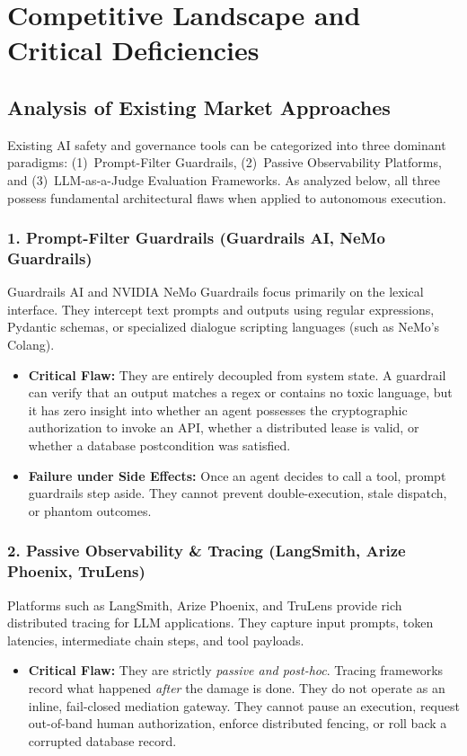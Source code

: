 \documentclass[11pt,a4paper]{article}
\begin{document}
\section{Competitive Landscape and Critical Deficiencies}

\subsection{Analysis of Existing Market Approaches}
Existing AI safety and governance tools can be categorized into three dominant paradigms: (1)~Prompt-Filter Guardrails, (2)~Passive Observability Platforms, and (3)~LLM-as-a-Judge Evaluation Frameworks. As analyzed below, all three possess fundamental architectural flaws when applied to autonomous execution.

\subsubsection{1. Prompt-Filter Guardrails (Guardrails AI, NeMo Guardrails)}
Guardrails AI and NVIDIA NeMo Guardrails focus primarily on the lexical interface. They intercept text prompts and outputs using regular expressions, Pydantic schemas, or specialized dialogue scripting languages (such as NeMo's Colang).
\begin{itemize}[leftmargin=*,itemsep=2pt]
  \item \textbf{Critical Flaw:} They are entirely decoupled from system state. A guardrail can verify that an output matches a regex or contains no toxic language, but it has zero insight into whether an agent possesses the cryptographic authorization to invoke an API, whether a distributed lease is valid, or whether a database postcondition was satisfied.
  \item \textbf{Failure under Side Effects:} Once an agent decides to call a tool, prompt guardrails step aside. They cannot prevent double-execution, stale dispatch, or phantom outcomes.
\end{itemize}

\subsubsection{2. Passive Observability \& Tracing (LangSmith, Arize Phoenix, TruLens)}
Platforms such as LangSmith, Arize Phoenix, and TruLens provide rich distributed tracing for LLM applications. They capture input prompts, token latencies, intermediate chain steps, and tool payloads.
\begin{itemize}[leftmargin=*,itemsep=2pt]
  \item \textbf{Critical Flaw:} They are strictly \emph{passive and post-hoc}. Tracing frameworks record what happened \emph{after} the damage is done. They do not operate as an inline, fail-closed mediation gateway. They cannot pause an execution, request out-of-band human authorization, enforce distributed fencing, or roll back a corrupted database record.
\end{itemize}
\end{document}
